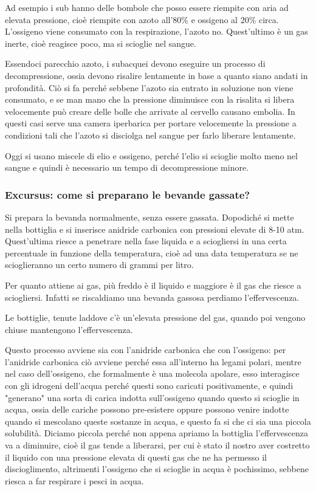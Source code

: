 \vspace{0.4cm}Ad esempio i sub hanno delle bombole che posso essere riempite con aria ad elevata pressione, cioè riempite con azoto all'80\% e ossigeno al 20\% circa. L'ossigeno viene consumato con la respirazione, l'azoto no. Quest'ultimo è un gas inerte, cioè reagisce poco, ma si scioglie nel sangue.

Essendoci parecchio azoto, i subacquei devono eseguire un processo di decompressione, ossia devono risalire lentamente in base a quanto siano andati in profondità. Ciò si fa perché sebbene l'azoto sia entrato in soluzione non viene consumato, e se man mano che la pressione diminuisce con la risalita si libera velocemente può creare delle bolle che arrivate al cervello causano embolia. In questi casi serve una camera iperbarica per portare velocemente la pressione a condizioni tali che l'azoto si disciolga nel sangue per farlo liberare lentamente.

Oggi si usano miscele di elio e ossigeno, perché l'elio si scioglie molto meno nel sangue e quindi è necessario un tempo di decompressione minore.

\subsubsection{Excursus: come si preparano le bevande gassate?}

Si prepara la bevanda normalmente, senza essere gassata. Dopodiché si mette nella bottiglia e si inserisce anidride carbonica con pressioni elevate di 8-10 atm. Quest'ultima riesce a penetrare nella fase liquida e a sciogliersi in una certa percentuale in funzione della temperatura, cioè ad una data temperatura se ne scioglieranno un certo numero di grammi per litro. 

Per quanto attiene ai gas, più freddo è il liquido e maggiore è il gas che riesce a sciogliersi. Infatti se riscaldiamo una bevanda gassosa perdiamo l'effervescenza.

Le bottiglie, tenute laddove c'è un'elevata pressione del gas, quando poi vengono chiuse mantengono l'effervescenza.

Questo processo avviene sia con l'anidride carbonica che con l'ossigeno: per l'anidride carbonica ciò avviene perché essa all'interno ha legami polari, mentre nel caso dell'ossigeno, che formalmente è una molecola apolare, esso interagisce con gli idrogeni dell'acqua perché questi sono caricati positivamente, e quindi "generano" una sorta di carica indotta sull'ossigeno quando questo si scioglie in acqua, ossia delle cariche possono pre-esistere oppure possono venire indotte quando si mescolano queste sostanze in acqua, e questo fa si che ci sia una piccola solubilità. Diciamo piccola perché non appena apriamo la bottiglia l'effervescenza va a diminuire, cioè il gas tende a liberarsi, per cui è stato il nostro aver costretto il liquido con una pressione elevata di questi gas che ne ha permesso il discioglimento, altrimenti l'ossigeno che si scioglie in acqua è pochissimo, sebbene riesca a far respirare i pesci in acqua.

